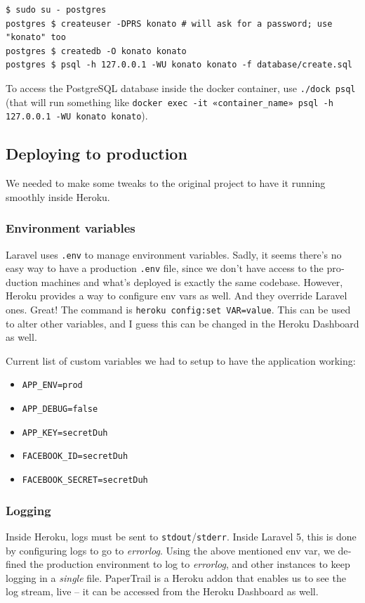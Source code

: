 \documentclass[12pt,a4paper,twoside,hyphens,english,brazil]{abntex2}
\begin{document}
{\begin{otherlanguage}{english}
\begin{verbatim}
$ sudo su - postgres
postgres $ createuser -DPRS konato # will ask for a password; use "konato" too
postgres $ createdb -O konato konato
postgres $ psql -h 127.0.0.1 -WU konato konato -f database/create.sql
\end{verbatim}
To access the PostgreSQL database inside the docker container, use \texttt{./dock psql} (that will run something like \texttt{docker exec -it «container\_name» psql -h 127.0.0.1 -WU konato konato}).

\subsection{Deploying to production}
We needed to make some tweaks to the original project to have it running smoothly inside Heroku.

\subsubsection{Environment variables}
Laravel uses \texttt{.env} to manage environment variables. Sadly, it seems there's no easy way to have a production \texttt{.env} file, since we don't have access to the production machines and what's deployed is exactly the same codebase. However, Heroku provides a way to configure env vars as well. And they override Laravel ones. Great! The command is \texttt{heroku config:set VAR=value}. This can be used to alter other variables, and I guess this can be changed in the Heroku Dashboard as well.

Current list of custom variables we had to setup to have the application working:

\begin{itemize}[itemsep=-1ex]
	\item \texttt{APP\_ENV=prod}
	\item \texttt{APP\_DEBUG=false}
	\item \texttt{APP\_KEY=secretDuh}
	\item \texttt{FACEBOOK\_ID=secretDuh}
	\item \texttt{FACEBOOK\_SECRET=secretDuh}
\end{itemize}

\subsubsection{Logging}
Inside Heroku, logs must be sent to \texttt{stdout}/\texttt{stderr}. Inside Laravel 5, this is done by configuring logs to go to \emph{errorlog}. Using the above mentioned env var, we defined the production environment to log to \emph{errorlog}, and other instances to keep logging in a \emph{single} file. PaperTrail is a Heroku addon that enables us to see the log stream, live -- it can be accessed from the Heroku Dashboard as well.


\end{otherlanguage}}
\end{document}
